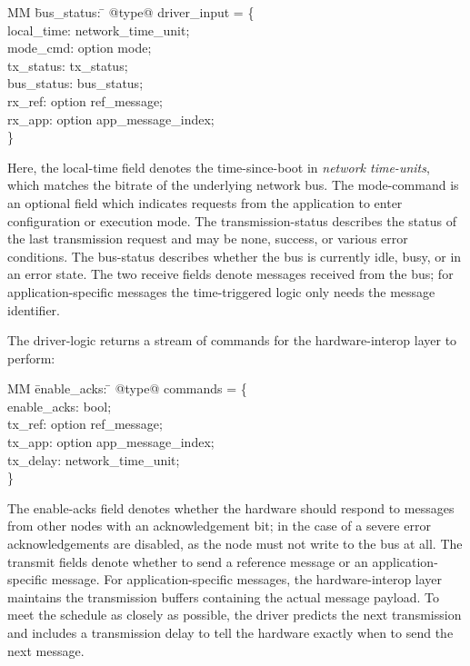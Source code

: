 \begin{tabbing}
  MM \= bus_status: \= \kill
  @type@ driver_input = \{ \\
    \> local_time: \> network_time_unit; \\
    \> mode_cmd: \> option mode; \\
    \> tx_status: \> tx_status; \\
    \> bus_status: \> bus_status; \\
    \> rx_ref: \> option ref_message; \\
    \> rx_app: \> option app_message_index; \\
    \}
\end{tabbing}

Here, the local-time field denotes the time-since-boot in \emph{network time-units}, which matches the bitrate of the underlying network bus.
The mode-command is an optional field which indicates requests from the application to enter configuration or execution mode.
The transmission-status describes the status of the last transmission request and may be none, success, or various error conditions.
The bus-status describes whether the bus is currently idle, busy, or in an error state.
The two receive fields denote messages received from the bus; for application-specific messages the time-triggered logic only needs the message identifier.

The driver-logic returns a stream of commands for the hardware-interop layer to perform:

\begin{tabbing}
  MM \= enable_acks: \= \kill
  @type@ commands = \{ \\
  \> enable_acks: \> bool; \\
  \> tx_ref: \>       option ref_message; \\
  \> tx_app: \> option app_message_index; \\
  \> tx_delay: \>     network_time_unit; \\
 \}
\end{tabbing}

The enable-acks field denotes whether the hardware should respond to messages from other nodes with an acknowledgement bit; in the case of a severe error acknowledgements are disabled, as the node must not write to the bus at all.
The transmit fields denote whether to send a reference message or an application-specific message.
For application-specific messages, the hardware-interop layer maintains the transmission buffers containing the actual message payload.
To meet the schedule as closely as possible, the driver predicts the next transmission and includes a transmission delay to tell the hardware exactly when to send the next message.


